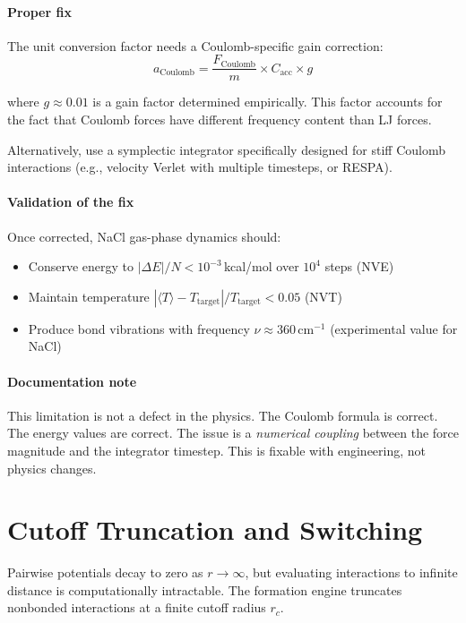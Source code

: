 \documentclass[11pt]{article}
\begin{document}
\paragraph{Proper fix} The unit conversion factor needs a Coulomb-specific gain correction:
\begin{equation}
a_{\text{Coulomb}} = \frac{F_{\text{Coulomb}}}{m} \times C_{\text{acc}} \times g
\end{equation}

where $g \approx 0.01$ is a gain factor determined empirically. This factor accounts for the fact that Coulomb forces have different frequency content than LJ forces.

Alternatively, use a symplectic integrator specifically designed for stiff Coulomb interactions (e.g., velocity Verlet with multiple timesteps, or RESPA).

\paragraph{Validation of the fix} Once corrected, NaCl gas-phase dynamics should:
\begin{itemize}
\item Conserve energy to $|\Delta E| / N < 10^{-3}$\,kcal/mol over $10^4$ steps (NVE)
\item Maintain temperature $|\langle T \rangle - T_{\text{target}}| / T_{\text{target}} < 0.05$ (NVT)
\item Produce bond vibrations with frequency $\nu \approx 360$\,cm$^{-1}$ (experimental value for NaCl)
\end{itemize}

\paragraph{Documentation note} This limitation is not a defect in the physics. The Coulomb formula is correct. The energy values are correct. The issue is a \textit{numerical coupling} between the force magnitude and the integrator timestep. This is fixable with engineering, not physics changes.

\section{Cutoff Truncation and Switching}

Pairwise potentials decay to zero as $r \to \infty$, but evaluating interactions to infinite distance is computationally intractable. The formation engine truncates nonbonded interactions at a finite cutoff radius $r_c$.
\end{document}
